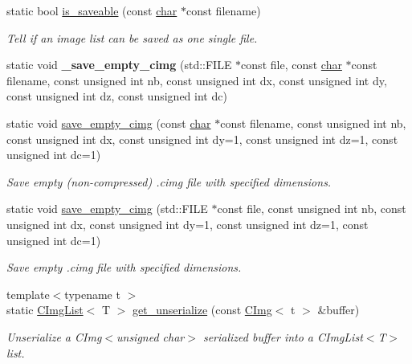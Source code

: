\begin{DoxyCompactItemize}
static bool \hyperlink{structcimg__library__suffixed_1_1CImgList_ae6a86adfeb4cdeb99f58565a6a49784b}{is\+\_\+saveable} (const \hyperlink{classchar}{char} $\ast$const filename)
\begin{DoxyCompactList}\small\item\em Tell if an image list can be saved as one single file. \end{DoxyCompactList}\item 
\mbox{\label{structcimg__library__suffixed_1_1CImgList_afd58a021cbb8c7fbfa682465b46872f2}} 
static void {\bfseries \+\_\+save\+\_\+empty\+\_\+cimg} (std\+::\+F\+I\+LE $\ast$const file, const \hyperlink{classchar}{char} $\ast$const filename, const unsigned int nb, const unsigned int dx, const unsigned int dy, const unsigned int dz, const unsigned int dc)
\item 
static void \hyperlink{structcimg__library__suffixed_1_1CImgList_a2374572081238aa19c9987d173ac28c2}{save\+\_\+empty\+\_\+cimg} (const \hyperlink{classchar}{char} $\ast$const filename, const unsigned int nb, const unsigned int dx, const unsigned int dy=1, const unsigned int dz=1, const unsigned int dc=1)
\begin{DoxyCompactList}\small\item\em Save empty (non-\/compressed) .cimg file with specified dimensions. \end{DoxyCompactList}\item 
static void \hyperlink{structcimg__library__suffixed_1_1CImgList_a88f04358691e1645b7f90196a7ca8fa6}{save\+\_\+empty\+\_\+cimg} (std\+::\+F\+I\+LE $\ast$const file, const unsigned int nb, const unsigned int dx, const unsigned int dy=1, const unsigned int dz=1, const unsigned int dc=1)
\begin{DoxyCompactList}\small\item\em Save empty .cimg file with specified dimensions. \end{DoxyCompactList}\item 
\mbox{\label{structcimg__library__suffixed_1_1CImgList_ab2437a10d0bbe2f4d5e91a49dc5cd105}} 
{\footnotesize template$<$typename t $>$ }\\static \hyperlink{structcimg__library__suffixed_1_1CImgList}{C\+Img\+List}$<$ T $>$ \hyperlink{structcimg__library__suffixed_1_1CImgList_ab2437a10d0bbe2f4d5e91a49dc5cd105}{get\+\_\+unserialize} (const \hyperlink{structcimg__library__suffixed_1_1CImg}{C\+Img}$<$ t $>$ \&buffer)
\begin{DoxyCompactList}\small\item\em Unserialize a C\+Img$<$unsigned char$>$ serialized buffer into a C\+Img\+List$<$\+T$>$ list. \end{DoxyCompactList}\end{DoxyCompactItemize}
